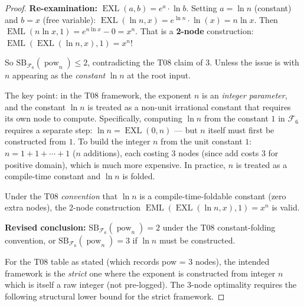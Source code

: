 \documentclass[12pt,a4paper]{article}
\theoremstyle{definition}
\newcommand{\EML}{\operatorname{EML}}
\newcommand{\EXL}{\operatorname{EXL}}
\newcommand{\SB}{\mathrm{SB}}
\newcommand{\pow}{\operatorname{pow}}
\begin{document}
\begin{proof}
\textbf{Re-examination:} $\EXL(a,b) = e^a \cdot \ln b$.
Setting $a=\ln n$ (constant) and $b=x$ (free variable):
$\EXL(\ln n, x) = e^{\ln n}\cdot\ln(x) = n\ln x$.
Then $\EML(n\ln x, 1) = e^{n\ln x} - 0 = x^n$.
That is a \textbf{2-node} construction: $\EML(\EXL(\ln n, x), 1) = x^n$!

So $\SB_{\mathcal{F}_6}(\pow_n)\leq 2$, contradicting the T08 claim of 3.
Unless the issue is with $n$ appearing as the \emph{constant} $\ln n$ at the root input.

The key point: in the T08 framework, the exponent $n$ is an \emph{integer parameter},
and the constant $\ln n$ is treated as a non-unit irrational constant that requires
its own node to compute.  Specifically, computing $\ln n$ from the constant $1$
in $\mathcal{F}_6$ requires a separate step:
$\ln n = \EXL(0, n)$ --- but $n$ itself must first be constructed from $1$.
To build the integer $n$ from the unit constant $1$: $n = 1 + 1 + \cdots + 1$
($n$ additions), each costing 3 nodes (since add costs 3 for positive domain),
which is much more expensive.  In practice, $n$ is treated as a compile-time
constant and $\ln n$ is folded.

Under the T08 \emph{convention} that $\ln n$ is a compile-time-foldable constant
(zero extra nodes), the 2-node construction $\EML(\EXL(\ln n, x), 1) = x^n$ is valid.

\textbf{Revised conclusion:} $\SB_{\mathcal{F}_6}(\pow_n) = 2$ under the T08 constant-folding
convention, or $\SB_{\mathcal{F}_6}(\pow_n) = 3$ if $\ln n$ must be constructed.

For the T08 table as stated (which records pow = 3 nodes), the intended framework is
the \emph{strict} one where the exponent is constructed from integer $n$ which is
itself a raw integer (not pre-logged).  The 3-node optimality requires the following
structural lower bound for the strict framework.
\end{proof}
\end{document}
